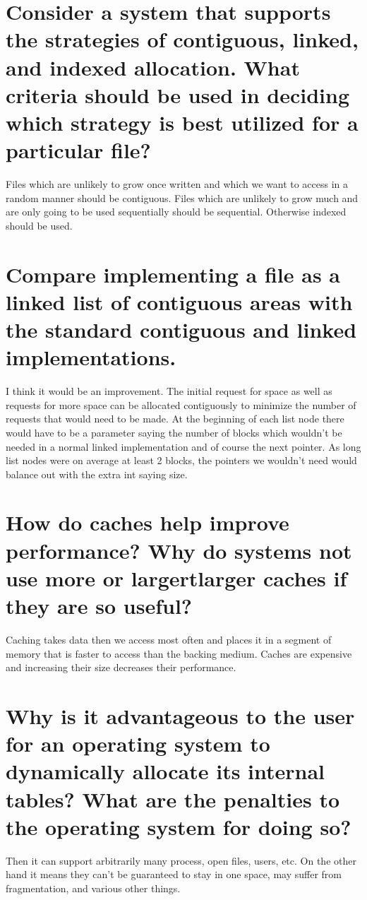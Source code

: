 \documentclass{book}%
\begin{document}
\section{Consider a system that supports the strategies of contiguous, linked,
and indexed allocation. What criteria should be used in deciding which strategy
is best utilized for a particular file?}
Files which are unlikely to grow once written and which we want to access in a
random manner should be contiguous. Files which are unlikely to grow much and
are only going to be used sequentially should be sequential. Otherwise indexed
should be used.
\section{Compare implementing a file as a linked list of contiguous areas with
the standard contiguous and linked implementations.}
I think it would be an improvement. The initial request for space as well as
requests for more space can be allocated contiguously to minimize the number
of requests that would need to be made. At the beginning of each list node there
would have to be a parameter saying the number of blocks which wouldn't be
needed in a normal linked implementation and of course the next pointer. As
long list nodes were on average at least 2 blocks, the pointers we wouldn't
need would balance out with the extra int saying size.
\section{How do caches help improve performance? Why do systems not use more or
largertlarger caches if they are so useful?}
Caching takes data then we access most often and places it in a segment of
memory that is faster to access than the backing medium. Caches are expensive
and increasing their size decreases their performance.
\section{Why is it advantageous to the user for an operating system to
dynamically allocate its internal tables? What are the penalties to the
operating system for doing so?}
Then it can support arbitrarily many process, open files, users, etc. On the
other hand it means they can't be guaranteed to stay in one space, may suffer
from fragmentation, and various other things.
\end{document}
